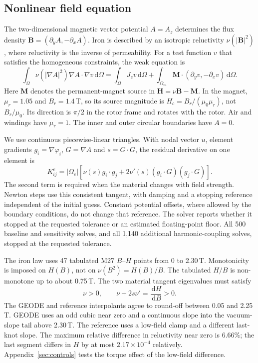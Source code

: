 \documentclass{anvil-paper}
\newcommand{\dd}{\,\mathrm{d}}
\begin{document}
\subsection{Nonlinear field equation}
The two-dimensional magnetic vector potential $A=A_z$ determines the
flux density $\mathbf B=(\partial_y A,-\partial_x A)$. Iron is described
by an isotropic reluctivity $\nu(|\mathbf B|^2)$, where reluctivity is
the inverse of permeability. For a test function $v$ that satisfies the
homogeneous constraints, the weak equation is
\begin{equation}
 \int_\Omega \nu(|\nabla A|^2)\nabla A\cdot\nabla v\dd\Omega
 =\int_\Omega J_z v\dd\Omega
  +\int_{\Omega_m}\mathbf M\cdot(\partial_y v,-\partial_x v)\dd\Omega.
 \label{eq:weak}
\end{equation}
Here $\mathbf M$ denotes the permanent-magnet source in
$\mathbf H=\nu\mathbf B-\mathbf M$. In the magnet,
$\mu_r=1.05$ and $B_r=1.4$\,T, so its source magnitude is
$H_c=B_r/(\mu_0\mu_r)$, not $B_r/\mu_0$. Its direction is $\pi/2$
in the rotor frame and rotates with the rotor. Air and windings have
$\mu_r=1$. The inner and outer circular boundaries have $A=0$.

We use continuous piecewise-linear triangles. With nodal vector $u$,
element gradients $g_i=\nabla\varphi_i$, $G=\nabla A$ and $s=G\cdot G$,
the residual derivative on one element is
\begin{equation}
 K^e_{ij}=|\Omega_e|\left[\nu(s)g_i\cdot g_j
       +2\nu'(s)(g_i\cdot G)(g_j\cdot G)\right].
 \label{eq:tangent}
\end{equation}
The second term is required when the material changes with field strength.
Newton steps use this consistent tangent, with damping and a stopping
reference independent of the initial guess. Constant potential offsets,
where allowed by the boundary conditions, do not change that reference.
The solver reports whether it stopped at the requested tolerance or an
estimated floating-point floor. All 500 baseline and sensitivity solves, and all 1,140
additional harmonic-coupling solves, stopped at the requested tolerance.

The iron law uses 47 tabulated M27 $B$--$H$ points from 0 to 2.30\,T.
Monotonicity is imposed on $H(B)$, not on $\nu(B^2)=H(B)/B$.
The tabulated $H/B$ is non-monotone up to about 0.75\,T.
The two material tangent eigenvalues must satisfy
\begin{equation}
 \nu>0,\qquad \nu+2s\nu'=\frac{\dd H}{\dd B}>0.
\end{equation}
The GEODE and reference interpolants agree to round-off between 0.05 and
2.25\,T. GEODE uses an odd cubic near zero and a continuous slope into the
vacuum-slope tail above 2.30\,T. The reference uses a low-field clamp and
a different last-knot slope. The maximum relative difference in
reluctivity near zero is 6.66\%; the last segment differs in $H$ by at
most $2.17\times10^{-4}$ relatively. Appendix~\ref{sec:controls} tests the
torque effect of the low-field difference.
\end{document}
